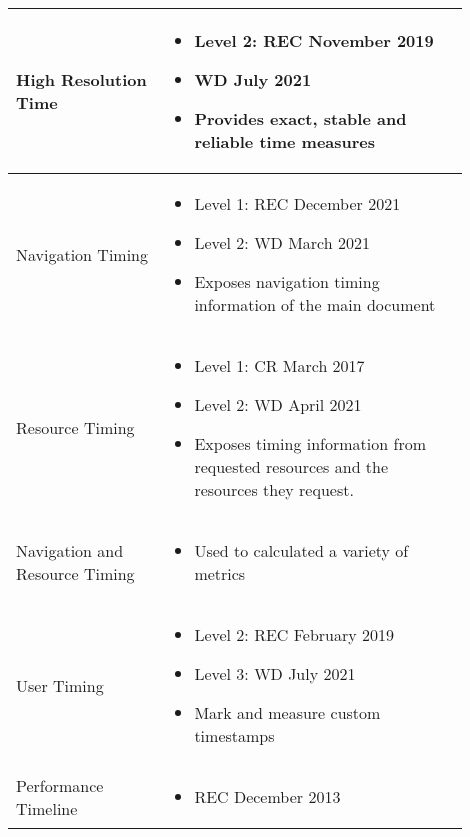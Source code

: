 \begin{center}
\small
	\begin{tabular}{ p{0.3\linewidth} | p{0.6\linewidth} }
	\hline
	High Resolution Time &
	\begin{itemize}[label={}, noitemsep,nolistsep, leftmargin=0cm]
		\item Level 2: REC November 2019
		\item WD July 2021
		\item Provides exact, stable and reliable time measures
	\end{itemize} \\
	\hline
	Navigation Timing &
	\begin{itemize}[label={}, noitemsep,nolistsep, leftmargin=0cm]
		\item Level 1: REC December 2021
		\item Level 2: WD March 2021
		\item Exposes navigation timing information of the main document
	\end{itemize} \\
	\hline
	Resource Timing &
	\begin{itemize}[label={}, noitemsep,nolistsep, leftmargin=0cm]
		\item Level 1: CR March 2017
		\item Level 2: WD April 2021
		\item Exposes timing information from requested resources and the resources they request. 
	\end{itemize} \\
	\hline
	Navigation and Resource Timing &
	\begin{itemize}[label={}, noitemsep,nolistsep, leftmargin=0cm]
		\item Used to calculated a variety of metrics
	\end{itemize} \\	
	\hline
	\hline
	User Timing & 
	\begin{itemize}[label={}, noitemsep,nolistsep, leftmargin=0cm]
		\item Level 2: REC February 2019
		\item Level 3: WD July 2021
		\item Mark and measure custom timestamps
	\end{itemize} \\  
	\hline
	Performance Timeline &
	\begin{itemize}[label={}, noitemsep,nolistsep, leftmargin=0cm]
		\item REC December 2013

\end{itemize}
\end{tabular}
\end{center}
